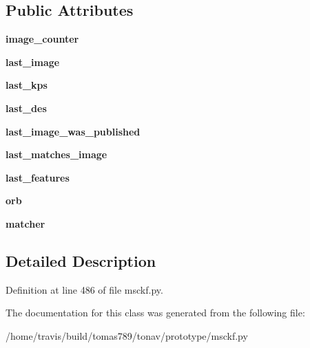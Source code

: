 \subsection*{Public Attributes}
\begin{DoxyCompactItemize}
\item 
\hypertarget{classmsckf_1_1_image_tracker_ac0bdc5e455ec9a9e179f88576444678a}{{\bfseries image\-\_\-counter}}\label{classmsckf_1_1_image_tracker_ac0bdc5e455ec9a9e179f88576444678a}

\item 
\hypertarget{classmsckf_1_1_image_tracker_a5f3fcf1a20788c99f16a3ead38a0931e}{{\bfseries last\-\_\-image}}\label{classmsckf_1_1_image_tracker_a5f3fcf1a20788c99f16a3ead38a0931e}

\item 
\hypertarget{classmsckf_1_1_image_tracker_a6b825a2e9b42766b1ab8c0781ecc5a41}{{\bfseries last\-\_\-kps}}\label{classmsckf_1_1_image_tracker_a6b825a2e9b42766b1ab8c0781ecc5a41}

\item 
\hypertarget{classmsckf_1_1_image_tracker_a8cd7b9cfc26ad48bc0adfa8da1e0edcb}{{\bfseries last\-\_\-des}}\label{classmsckf_1_1_image_tracker_a8cd7b9cfc26ad48bc0adfa8da1e0edcb}

\item 
\hypertarget{classmsckf_1_1_image_tracker_a2764caa363b3ff3de9f854b47977947d}{{\bfseries last\-\_\-image\-\_\-was\-\_\-published}}\label{classmsckf_1_1_image_tracker_a2764caa363b3ff3de9f854b47977947d}

\item 
\hypertarget{classmsckf_1_1_image_tracker_a61d25a81ca62500d4b64b3c216817e68}{{\bfseries last\-\_\-matches\-\_\-image}}\label{classmsckf_1_1_image_tracker_a61d25a81ca62500d4b64b3c216817e68}

\item 
\hypertarget{classmsckf_1_1_image_tracker_a5c21c3f90f387f6f1d50814105736ad6}{{\bfseries last\-\_\-features}}\label{classmsckf_1_1_image_tracker_a5c21c3f90f387f6f1d50814105736ad6}

\item 
\hypertarget{classmsckf_1_1_image_tracker_af04b2528381cdaa7ad4ff2558f1634f3}{{\bfseries orb}}\label{classmsckf_1_1_image_tracker_af04b2528381cdaa7ad4ff2558f1634f3}

\item 
\hypertarget{classmsckf_1_1_image_tracker_a3b793e2f18c9c29fe8a584d9974c1b6a}{{\bfseries matcher}}\label{classmsckf_1_1_image_tracker_a3b793e2f18c9c29fe8a584d9974c1b6a}

\end{DoxyCompactItemize}


\subsection{Detailed Description}


Definition at line 486 of file msckf.\-py.



The documentation for this class was generated from the following file\-:\begin{DoxyCompactItemize}
\item 
/home/travis/build/tomas789/tonav/prototype/msckf.\-py\end{DoxyCompactItemize}
